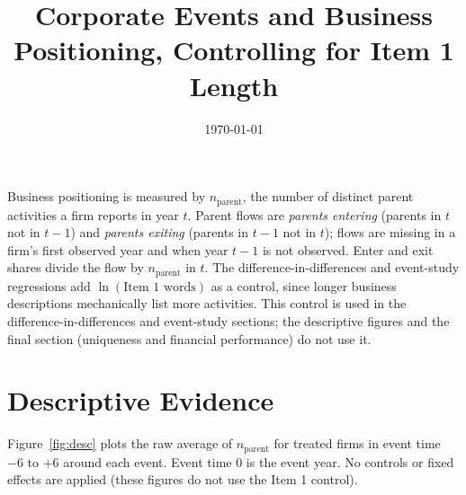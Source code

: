 \documentclass[11pt]{article}
\title{Corporate Events and Business Positioning, Controlling for Item 1 Length}
\author{}
\date{\today}
\begin{document}
\maketitle

\noindent Business positioning is measured by $n_{\mathrm{parent}}$, the number of distinct parent
activities a firm reports in year $t$. Parent flows are \emph{parents entering} (parents in $t$ not
in $t-1$) and \emph{parents exiting} (parents in $t-1$ not in $t$); flows are missing in a firm's
first observed year and when year $t-1$ is not observed. Enter and exit shares divide the flow by
$n_{\mathrm{parent}}$ in $t$. The difference-in-differences and event-study regressions add $\ln(\text{Item 1 words})$ as a control, since
longer business descriptions mechanically list more activities. This control is used in the
difference-in-differences and event-study sections; the descriptive figures and the final
section (uniqueness and financial performance) do not use it.

\section{Descriptive Evidence}

Figure~\ref{fig:desc} plots the raw average of $n_{\mathrm{parent}}$ for treated firms in event
time $-6$ to $+6$ around each event. Event time $0$ is the event year. No controls or fixed
effects are applied (these figures do not use the Item 1 control).
\end{document}
